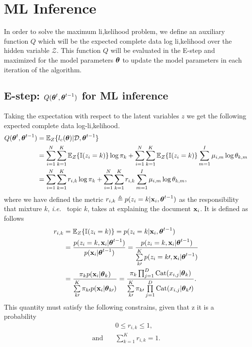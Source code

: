 \documentclass[12pt]{article}
\begin{document}
   
\section{ML Inference}

\noindent In order to solve the maximum li,kelihood problem, we define an auxiliary function $Q$ which will be the expected complete data log li,kelihood over the hidden variable $\mathcal{Z}$. This function $Q$ will be evaluated in the E-step and maximized for the model parameters $\boldsymbol\theta$ to update the model parameters in each iteration of the algorithm.
\subsection{E-step: $Q(\boldsymbol\theta^t, \boldsymbol\theta^{t-1})$ for ML inference}

Taking the expectation with respect to the latent variables $z$ we get the following expected complete data log-li,kelihood.
\begin{align}
    Q(\boldsymbol\theta^t, \boldsymbol\theta^{t-1}) & = \mathbb{E}_Z\{l_c(\boldsymbol\theta)|\mathcal{D},\boldsymbol\theta^{t-1}\}  \\
    & = \sum_{i=1}^N\sum_{k=1}^K\mathbb{E}_Z\{\mathbb{I} (z_i=k)\} \log \pi_k + \sum_{i=1}^N\sum_{k=1}^K\mathbb{E}_Z\{\mathbb{I}(z_i=k)\} \sum_{m=1}^I \mu_{i,m}\log \theta_{k,m}\\
    & = \sum_{i=1}^N\sum_{k=1}^K r_{i,k}\log \pi_k + \sum_{i=1}^N\sum_{k=1}^K r_{i,k}\sum_{m=1}^I \mu_{i,m}\log \theta_{k,m} \label{eq:Q_function},
\end{align}
where we have defined the metric $r_{i,k} \triangleq p(z_i = k | \mathbf{x}_i,\boldsymbol\theta^{t-1})$ \cite{murphy2012machine} as the responsibility that mixture $k$, \textit{i.e.\ } topic $k$, takes at explaining the document $\mathbf{x}_i$. It is defined as follows
\begin{align}\label{eq:r_i,k}
	r_{i,k} & = \mathbb{E}_Z\{ \mathbb{I}(z_i=k) \} = p(z_i = k|\mathbf{x}_i,\boldsymbol\theta^{t-1}) \\
	& = \frac{p(z_i=k,\mathbf{x}_i|\boldsymbol\theta^{t-1})}{p(\mathbf{x}_i|\boldsymbol\theta^{t-1})} = \frac{p(z_i=k,\mathbf{x}_i|\boldsymbol\theta^{t-1})}{\sum \limits_{k\prime}^{K}p(z_i=k\prime,\mathbf{x}_i|\boldsymbol\theta^{t-1})}\\
	& = \frac{\pi_k p(\mathbf{x}_i|\boldsymbol\theta_k)}{\sum \limits_{k\prime}^K \pi_{k\prime} p(\mathbf{x}_i|\boldsymbol\theta_{k\prime})}  =	\frac{\pi_k\prod_{j=1}^{D}\operatorname{\mathrm{Cat}}(x_{i,j}|\boldsymbol\theta_k)}{\sum \limits_{k\prime}^{K} \pi_{k\prime} \prod \limits_{j=1}^{D}\operatorname{\mathrm{Cat}}(x_{i,j}|\boldsymbol\theta_k\prime)}.
\end{align}
This quantity must satisfy the following constrains, given that z it is a probability
\begin{align}\label{eq:ri,k_constriant}
& 0 \leq r_{i,k} \leq 1, \\
\text{and} \quad & \sum \limits_{k=1}^{K} r_{i,k} = 1.
\end{align}
\end{document}
